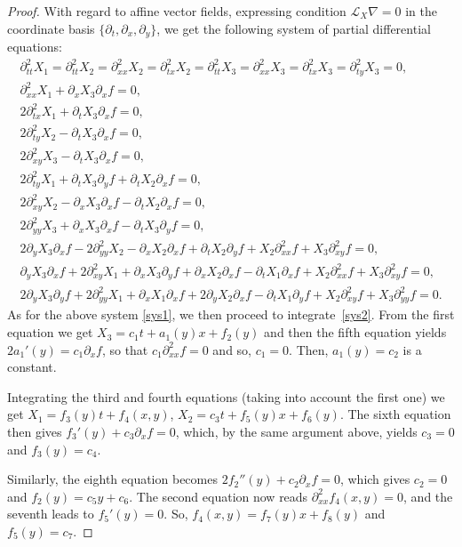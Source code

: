 \documentclass[pdftex]{sigma}
\numberwithin{equation}{section}
\begin{document}
\begin{proof}
With regard to af\/f\/ine vector f\/ields, expressing condition $\mathcal L_X\nabla=0$ in the coordinate basis $\{\partial_t,\partial_x,\partial_y\}$, we get the following system of partial dif\/ferential equations:
\begin{gather}
\partial_{tt}^2X_1=\partial_{tt}^2X_2=\partial_{xx}^2X_2=\partial_{tx}^2X_2=\partial_{tt}^2X_3=\partial_{xx}^2X_3=\partial_{tx}^2X_3=\partial_{ty}^2X_3=0,
\nonumber\\
\partial_{xx}^2X_1+\partial_xX_3\partial_xf=0,\nonumber\\
2\partial_{tx}^2X_1+\partial_tX_3\partial_xf=0,\nonumber\\
2\partial_{ty}^2X_2-\partial_tX_3\partial_xf=0,\nonumber\\
2\partial_{xy}^2X_3-\partial_tX_3\partial_xf=0,\nonumber\\
2\partial_{ty}^2X_1+\partial_tX_3\partial_yf+\partial_tX_2\partial_xf=0,\nonumber\\
2\partial_{xy}^2X_2-\partial_xX_3\partial_xf-\partial_tX_2\partial_xf=0,\nonumber\\
2\partial_{yy}^2X_3+\partial_xX_3\partial_xf-\partial_tX_3\partial_yf=0,\nonumber\\
2\partial_yX_3\partial_xf-2\partial_{yy}^2X_2-\partial_xX_2\partial_xf+\partial_tX_2\partial_yf+X_2\partial_{xx}^2f+X_3\partial_{xy}^2f=0,\nonumber\\
 \partial_yX_3\partial_xf+2\partial_{xy}^2X_1+\partial_xX_3\partial_yf+\partial_xX_2\partial_xf-\partial_tX_1\partial_xf
 +X_2\partial_{xx}^2f+X_3\partial_{xy}^2f=0,\nonumber\\
 2\partial_yX_3\partial_yf+2\partial_{yy}^2X_1+\partial_xX_1\partial_xf+2\partial_yX_2\partial_xf-\partial_tX_1\partial_yf
 +X_2\partial_{xy}^2f+X_3\partial_{yy}^2f=0.\label{sys2}
\end{gather}
As for the above system \eqref{sys1}, we then proceed to integrate~\eqref{sys2}. From the f\/irst equation we get $X_3=c_1t+a_1(y)x+f_2(y)$ and then the f\/ifth equation yields $2a_1 '(y)=c_1\partial_xf$, so that $c_1\partial_{xx}^2f=0$ and so, $c_1=0$. Then, $a_1(y)=c_2$ is a constant.

Integrating the third and fourth equations (taking into account the f\/irst one) we get $X_1=f_3(y)t+f_4(x,y)$, $X_2=c_3t+f_5(y)x+f_6(y)$. The sixth equation then gives $f_3 '(y)+c_3\partial_xf=0$, which, by the same argument above, yields $c_3=0$ and $f_3(y)=c_4$.

Similarly, the eighth equation becomes $2f_2 ''(y)+c_2\partial_xf=0$, which gives $c_2=0$ and $f_2(y)=c_5y+c_6$. The second equation now reads $\partial_{xx}^2f_4(x,y)=0$, and the seventh leads to $f_5 '(y)=0$. So, $f_4(x,y)=f_7(y)x+f_8(y)$ and $f_5(y)=c_7$.


\end{proof}
\end{document}
